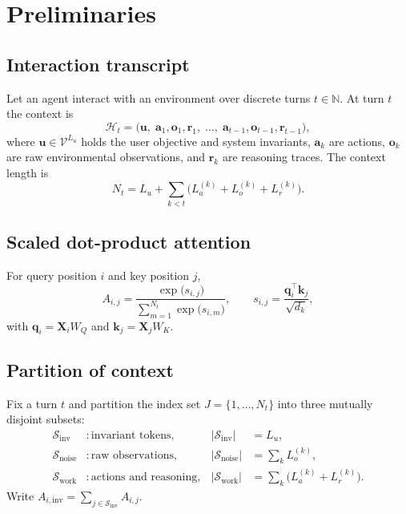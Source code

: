 ﻿\documentclass[11pt,a4paper]{article}
\theoremstyle{plain}
\theoremstyle{definition}
\theoremstyle{remark}
\begin{document}
\section{Preliminaries}
\label{sec:prelim}

\subsection{Interaction transcript}

Let an agent interact with an environment over discrete turns $t \in
\mathbb{N}$. At turn $t$ the context is
\begin{equation}
  \mathcal{H}_t
  = \bigl(\mathbf{u},\;
    \mathbf{a}_1,\mathbf{o}_1,\mathbf{r}_1,\;
    \dots,\;
    \mathbf{a}_{t-1},\mathbf{o}_{t-1},\mathbf{r}_{t-1}\bigr),
\end{equation}
where $\mathbf{u} \in \mathcal{V}^{L_u}$ holds the user objective and system
invariants, $\mathbf{a}_k$ are actions, $\mathbf{o}_k$ are raw environmental
observations, and $\mathbf{r}_k$ are reasoning traces. The context length is
\begin{equation}
  N_t = L_u + \sum_{k<t}\bigl(L_a^{(k)} + L_o^{(k)} + L_r^{(k)}\bigr).
\end{equation}

\subsection{Scaled dot-product attention}

For query position $i$ and key position $j$,
\begin{equation}
  A_{i,j}
  = \frac{\exp\!\bigl(s_{i,j}\bigr)}{\sum_{m=1}^{N_t}\exp\!\bigl(s_{i,m}\bigr)},
  \qquad
  s_{i,j} = \frac{\mathbf{q}_i^{\top}\mathbf{k}_j}{\sqrt{d_k}},
  \label{eq:attn}
\end{equation}
with $\mathbf{q}_i = \mathbf{X}_i W_Q$ and $\mathbf{k}_j = \mathbf{X}_j W_K$.

\subsection{Partition of context}

Fix a turn $t$ and partition the index set $J = \{1,\dots,N_t\}$ into three
mutually disjoint subsets:
\begin{align}
  \mathcal{S}_{\mathrm{inv}} &: \text{invariant tokens}, &
  |\mathcal{S}_{\mathrm{inv}}| &= L_u, \\
  \mathcal{S}_{\mathrm{noise}} &: \text{raw observations}, &
  |\mathcal{S}_{\mathrm{noise}}| &= \textstyle\sum_k L_o^{(k)}, \\
  \mathcal{S}_{\mathrm{work}} &: \text{actions and reasoning}, &
  |\mathcal{S}_{\mathrm{work}}| &= \textstyle\sum_k \bigl(L_a^{(k)}+L_r^{(k)}\bigr).
\end{align}
Write $A_{i,\mathrm{inv}} = \sum_{j \in \mathcal{S}_{\mathrm{inv}}} A_{i,j}$.
\end{document}
